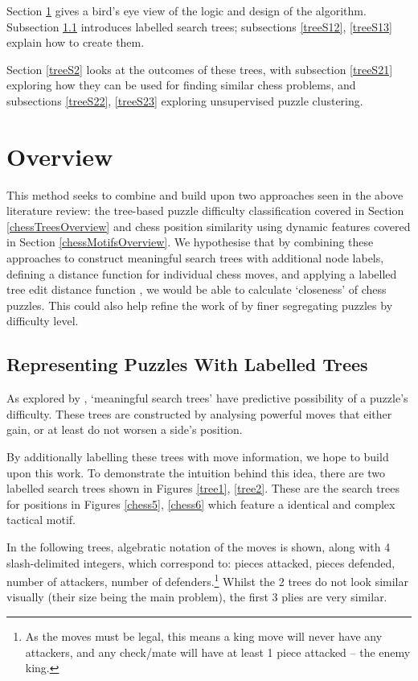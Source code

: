 Section \ref{treeS1} gives a bird's eye view of the logic and design of the
algorithm. Subsection \ref{treeS11} introduces labelled search trees;
subsections \ref{treeS12}, \ref{treeS13} explain how to create them.

Section \ref{treeS2} looks at the outcomes of these trees, with subsection
\ref{treeS21} exploring how they can be used for finding similar chess
problems, and subsections \ref{treeS22}, \ref{treeS23} exploring unsupervised
puzzle clustering.

\section{Overview}\label{treeS1}

This method seeks to combine and build upon two approaches seen in the above
literature review: the tree-based puzzle difficulty classification
\citep{chessTrees} covered in Section \ref{chessTreesOverview} and chess
position similarity using dynamic features \citep{chessMotifs} covered in
Section \ref{chessMotifsOverview}. We hypothesise that by combining these
approaches to construct meaningful search trees with additional node labels,
defining a distance function for individual chess moves, and applying a
labelled tree edit distance function \citep{editDistTrees}, we would be able to
calculate `closeness' of chess puzzles. This could also help refine the work of
\citet{chessTrees} by finer segregating puzzles by difficulty level.

\subsection{Representing Puzzles With Labelled Trees}\label{treeS11}

As explored by \citet{chessTrees}, `meaningful search trees' have predictive
possibility of a puzzle's difficulty. These trees are constructed by analysing
powerful moves that either gain, or at least do not worsen a side's position. 

By additionally labelling these trees with move information, we hope to build
upon this work. To demonstrate the intuition behind this idea, there are two
labelled search trees shown in Figures \ref{tree1}, \ref{tree2}. These are the
search trees for positions in Figures \ref{chess5}, \ref{chess6} which feature
a identical and complex tactical motif. 

In the following trees, algebratic notation of the moves is shown, along with 4
slash-delimited integers, which correspond to: pieces attacked, pieces
defended, number of attackers, number of defenders.\footnote{As the moves must
be legal, this means a king move will never have any attackers, and any
check/mate will have at least 1 piece attacked -- the enemy king.} Whilst the 2
trees do not look similar visually (their size being the main problem), the
first 3 plies are very similar. 

